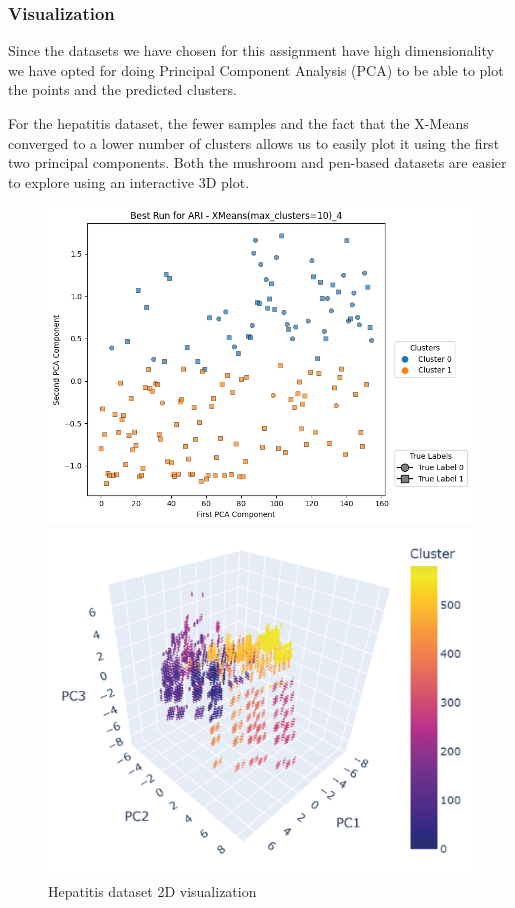 \subsubsection{Visualization}

Since the datasets we have chosen for this assignment have high dimensionality we have opted for doing Principal Component Analysis (PCA) to be able to plot the points and the predicted clusters. 

For the hepatitis dataset, the fewer samples and the fact that the X-Means converged to a lower number of clusters allows us to easily plot it using the first two principal components. Both the mushroom and pen-based datasets are easier to explore using an interactive 3D plot.

\begin{figure}[H]
    \centering
    \begin{minipage}[b]{0.45\linewidth}
        \centering
        \includegraphics[width=\linewidth]{figures/XMeans/hepatitis_visualization.png}
        \caption{Hepatitis dataset 2D visualization}
    \end{minipage}
    \hfill
    \begin{minipage}[b]{0.45\linewidth}
        \centering
        \includegraphics[width=\linewidth]{figures/XMeans/mushroom_visualization.png}

\end{minipage}
\end{figure}
